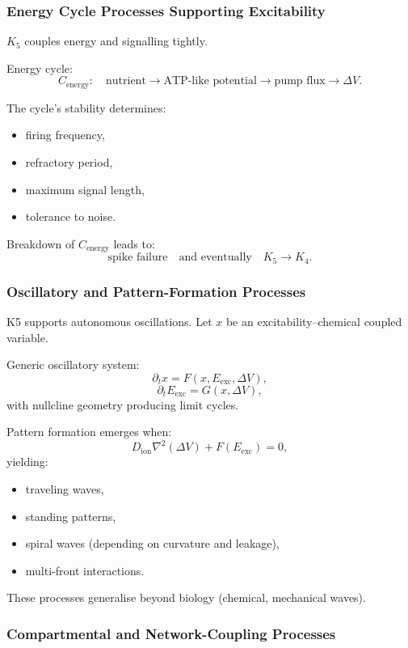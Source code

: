 \subsubsection{Energy Cycle Processes Supporting Excitability}

$K_5$ couples energy and signalling tightly.

Energy cycle:
\[
C_{\text{energy}}:\quad 
\text{nutrient} \to \text{ATP-like potential} \to 
\text{pump flux} \to \Delta V.
\]

The cycle’s stability determines:
\begin{itemize}
    \item firing frequency,
    \item refractory period,
    \item maximum signal length,
    \item tolerance to noise.
\end{itemize}

Breakdown of $C_{\text{energy}}$ leads to:
\[
\text{spike failure} \quad\text{and eventually}\quad K_5 \to K_4.
\]

\subsubsection{Oscillatory and Pattern-Formation Processes}

K5 supports autonomous oscillations.  
Let $x$ be an excitability–chemical coupled variable.

Generic oscillatory system:
\[
\partial_t x = F(x, E_{\text{exc}}, \Delta V),
\]
\[
\partial_t E_{\text{exc}} = G(x, \Delta V),
\]
with nullcline geometry producing limit cycles.

Pattern formation emerges when:
\[
D_{\text{ion}} \nabla^2 (\Delta V) + F(E_{\text{exc}}) = 0,
\]
yielding:
\begin{itemize}
    \item traveling waves,
    \item standing patterns,
    \item spiral waves (depending on curvature and leakage),
    \item multi-front interactions.
\end{itemize}

These processes generalise beyond biology (chemical, mechanical waves).

\subsubsection{Compartmental and Network-Coupling Processes}

